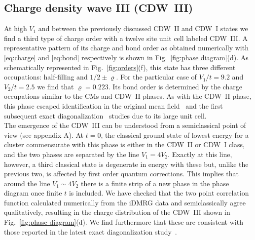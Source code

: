 \documentclass[aps,prx,10pt,twocolumn,floatfix,superscriptaddress,showpacs,numerical,footinbib]{revtex4-1}
\begin{document}
\subsection{Charge density wave III (CDW~III)}
%
At high $V_{1}$ and between the previously discussed CDW~II and CDW~I states
we find a third type of charge order with a twelve site unit cell labeled CDW~III.
%
A representative pattern of its charge and bond order as obtained numerically 
with \eqref{eq:charge} and \eqref{eq:bond} respectively
is shown in Fig.~\ref{fig:phase diagram}(d).
%
As schematically represented in Fig.~\ref{fig:orders}(f), this state has three 
different occupations: half-filling and $1/2\pm\varrho$.
%
For the particular case of $V_{1}/t=9.2$ and $V_{2}/t=2.5$ we find that $\varrho=0.223$.
%
Its bond order is determined by the charge occupations 
similar to the CMs and CDW~II phases.
%
As with the CDW~II phase, this phase escaped
identification in the original mean field~\cite{RQHZ08,WF10,GCC13} 
and the first subsequent exact diagonalization~\cite{GGNVC13,DH14,DCH14} studies 
due to its large unit cell.\\
%
The emergence of the CDW~III can be understood from a semiclassical point of view (see appendix A).
%
At $t=0$, the classical ground state of lowest energy for a cluster commensurate with this phase is either in the CDW~II or CDW~I class, 
and the two phases are separated by the line $V_{1}=4V_{2}$. 
%
Exactly at this line, however, a third classical state is degenerate in energy with these but, unlike the previous two, is affected by first order quantum corrections. 
%
This implies that around the line $V_{1}\sim4V_{2}$ there is a finite strip of a new phase in the phase diagram once finite $t$ is included. 
%
We have checked that the two point correlation function calculated numerically from the iDMRG data and semiclassically 
agree qualitatively, resulting in the charge distribution of the CDW~III shown in Fig.~\ref{fig:phase diagram}(d).
%
We find furthermore that these are consistent with those reported in the latest exact diagonalization study~\cite{CL15}. 
\end{document}
